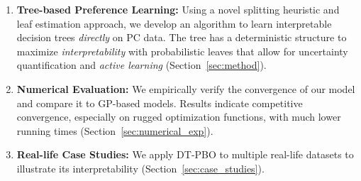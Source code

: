 \documentclass{article}
\begin{document}
\begin{enumerate}
    \item \textbf{Tree-based Preference Learning:} Using a novel splitting heuristic and leaf estimation approach, we develop an algorithm to learn interpretable decision trees \textit{directly} on PC data. The tree has a deterministic structure to maximize \textit{interpretability} with probabilistic leaves that allow for uncertainty quantification and \textit{active learning} (Section~\ref{sec:method}).
    \item \textbf{Numerical Evaluation:} We empirically verify the convergence of our model and compare it to GP-based models. Results indicate competitive convergence, especially on rugged optimization functions, with much lower running times (Section~\ref{sec:numerical_exp}).
    \item \textbf{Real-life Case Studies:} We apply DT-PBO to multiple real-life datasets to illustrate its interpretability (Section~\ref{sec:case_studies}). 
\end{enumerate}

\end{document}
